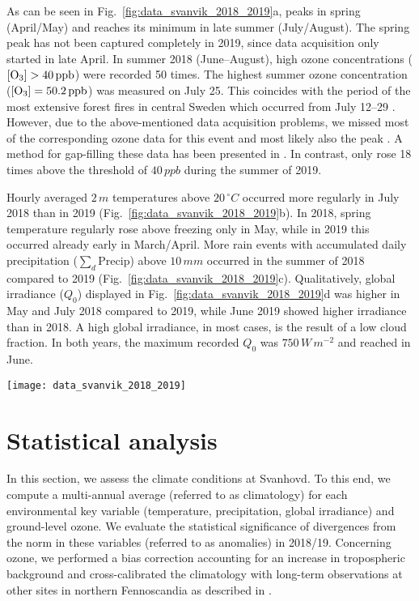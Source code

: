 \documentclass[bg, manuscript]{copernicus}
\begin{document}
As can be seen in Fig.~\ref{fig:data_svanvik_2018_2019}a, \chem{[O_3]} peaks in spring (April/May) and reaches its minimum in late summer (July/August). The spring peak has not been captured completely in 2019, since data acquisition only started in late April. In summer 2018 (June--August), high ozone concentrations ($\chem{[O_3]} > 40\,\unit{ppb}$) were recorded 50 times. The highest summer ozone concentration ($\chem{[O_3]} = 50.2\,\unit{ppb}$) was measured on July 25. This coincides with the period of the most extensive forest fires in central Sweden which occurred from July 12--29 \citep{SOU2019}. However, due to the above-mentioned data acquisition problems, we missed most of the corresponding ozone data for this event and most likely also the peak \chem{[O_3]}. A method for gap-filling these data has been presented in \citet{ACPD:Falk2021}. In contrast, \chem{[O_3]} only rose 18 times above the threshold of $40\,\unit{ppb}$ during the summer of 2019. 

Hourly averaged $2\,\unit{m}$ temperatures above $20\,\unit{^\circ C}$ occurred more regularly in July 2018 than in 2019 (Fig.~\ref{fig:data_svanvik_2018_2019}b). In 2018, spring temperature regularly rose above freezing only in May, while in 2019 this occurred already early in March/April.
More rain events with accumulated daily precipitation ($\sum_d \mathrm{Precip}$) above $10\,\unit{mm}$ occurred in the summer of 2018 compared to 2019 (Fig.~\ref{fig:data_svanvik_2018_2019}c).
Qualitatively, global irradiance ($Q_0$) displayed in Fig.~\ref{fig:data_svanvik_2018_2019}d was higher in May and July 2018 compared to 2019, while June 2019 showed higher irradiance than in 2018. A high global irradiance, in most cases, is the result of a low cloud fraction. In both years, the maximum recorded $Q_0$ was $750\,\unit{W\,m^{-2}}$ and reached in June.

\begin{figure*}[t]
  \texttt{[image: data\_svanvik\_2018\_2019]}
  \caption{Observational data from atmospheric monitoring at Svanhovd in 2018/19. The hatched areas indicate periods without ozone monitoring data. (a) Hourly averaged \chem{[O_3]}; (b) hourly averaged temperature; (c) daily accumulated precipitation; (d) hourly averaged global irradiance.}
  \label{fig:data_svanvik_2018_2019}
\end{figure*}

\section{Statistical analysis}
\label{sec:stats}
In this section, we assess the climate conditions at Svanhovd. To this end, we compute a multi-annual average (referred to as climatology) for each environmental key variable (temperature, precipitation, global irradiance) and ground-level ozone. We evaluate the statistical significance of divergences from the norm in these variables (referred to as anomalies) in 2018/19. Concerning ozone, we performed a bias correction accounting for an increase in tropospheric background \chem{[O_3]} and cross-calibrated the climatology with long-term observations at other sites in northern Fennoscandia as described in \citet{ACPD:Falk2021}.
\end{document}
